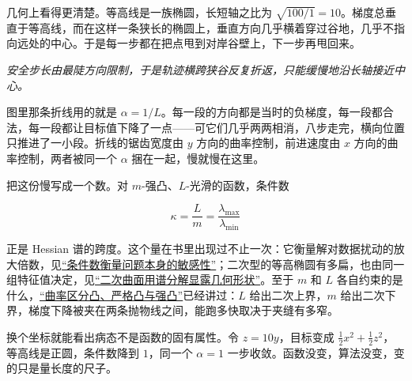 几何上看得更清楚。等高线是一族椭圆，长短轴之比为 \(\sqrt{100/1}=10\)。梯度总垂直于等高线，而在这样一条狭长的椭圆上，垂直方向几乎横着穿过谷地，几乎不指向远处的中心。于是每一步都在把点甩到对岸谷壁上，下一步再甩回来。

\begin{center}

\emph{安全步长由最陡方向限制，于是轨迹横跨狭谷反复折返，只能缓慢地沿长轴接近中心。}
\end{center}

图里那条折线用的就是 \(\alpha=1/L\)。每一段的方向都是当时的负梯度，每一段都合法，每一段都让目标值下降了一点——可它们几乎两两相消，八步走完，横向位置只推进了一小段。折线的锯齿宽度由 \(y\) 方向的曲率控制，前进速度由 \(x\) 方向的曲率控制，两者被同一个 \(\alpha\) 捆在一起，慢就慢在这里。

把这份慢写成一个数。对 \(m\)-强凸、\(L\)-光滑的函数，条件数

\[
\kappa=\frac{L}{m}=\frac{\lambda_{\max}}{\lambda_{\min}}
\]

正是 Hessian 谱的跨度。这个量在书里出现过不止一次：它衡量解对数据扰动的放大倍数，见\hyperref[sec:08-Numerical-Analysis/01-Floating-Point-and-Error/03]{``条件数衡量问题本身的敏感性''}；二次型的等高椭圆有多扁，也由同一组特征值决定，见\hyperref[sec:03-Linear-Algebra/06-Symmetric-and-Positive-Definite-Matrices/04]{``二次曲面用谱分解显露几何形状''}。至于 \(m\) 和 \(L\) 各自约束的是什么，\hyperref[sec:09-Convex-Optimization/03-Convex-Functions/03]{``曲率区分凸、严格凸与强凸''}已经讲过：\(L\) 给出二次上界，\(m\) 给出二次下界，梯度下降被夹在两条抛物线之间，能跑多快取决于夹缝有多窄。

换个坐标就能看出病态不是函数的固有属性。令 \(z=10y\)，目标变成 \(\frac{1}{2}x^2+\frac{1}{2}z^2\)，等高线是正圆，条件数降到 \(1\)，同一个 \(\alpha=1\) 一步收敛。函数没变，算法没变，变的只是量长度的尺子。

